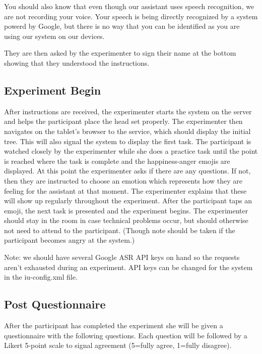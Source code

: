 \documentclass[a4paper,10pt]{article}
\begin{document}
You should also know that even though our assistant uses speech recognition, we are not recording your voice. Your speech is being directly recognized by a system powerd by Google, but there is no way that you can be identified as you are using our system on our devices. 

They are then asked by the experimenter to sign their name at the bottom showing that they understood the instructions. 

\subsection{Experiment Begin}

After instructions are received, the experimenter starts the system on the server and helps the participant place the head set properly. The experimenter then navigates on the tablet's browser to the service, which should display the initial tree. This will also signal the system to display the first task. The participant is watched closely by the experimenter while she does a practice task until the point is reached where the task is complete and the happiness-anger emojis are displayed. At this point the experimenter asks if there are any questions. If not, then they are instructed to choose an emotion which represents how they are feeling for the assistant at that moment. The experimenter explains that these will show up regularly throughout the experiment. After the participant taps an emoji, the next task is presented and the experiment begins. The experimenter should stay in the room in case technical problems occur, but should otherwise not need to attend to the participant. (Though note should be taken if the participant becomes angry at the system.)

Note: we should have several Google ASR API keys on hand so the requests aren't exhausted during an experiment. API keys can be changed for the system in the iu-config.xml file. 

\subsection{Post Questionnaire}

After the participant has completed the experiment she will be given a questionnaire with the following questions. Each question will be followed by a Likert 5-point scale to signal agreement (5=fully agree, 1=fully disagree).
\end{document}
